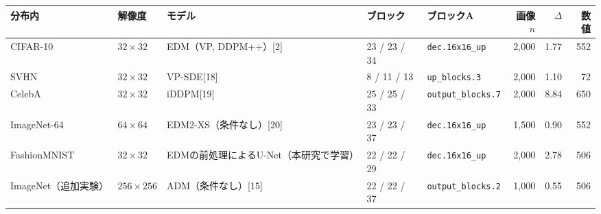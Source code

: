 \documentclass[border=3pt]{standalone}
\begin{document}
%
\begin{tabular}{lllllrrr}%
\toprule
分布内 & 解像度 & モデル & ブロック & ブロックA & 画像$n$ & $\Delta$ & 数値\\
\midrule
CIFAR-10 & $32{\times}32$ & EDM（VP, DDPM++）[2] & 23 / 23 / 34 & \texttt{dec.16x16\_up} & 2{,}000 & 1.77 & 552\\
SVHN & $32{\times}32$ & VP-SDE[18] & 8 / 11 / 13 & \texttt{up\_blocks.3} & 2{,}000 & 1.10 & 72\\
CelebA & $32{\times}32$ & iDDPM[19] & 25 / 25 / 33 & \texttt{output\_blocks.7} & 2{,}000 & 8.84 & 650\\
ImageNet-64 & $64{\times}64$ & EDM2-XS（条件なし）[20] & 23 / 23 / 37 & \texttt{dec.16x16\_up} & 1{,}500 & 0.90 & 552\\
FashionMNIST & $32{\times}32$ & EDMの前処理によるU-Net（本研究で学習） & 22 / 22 / 29 & \texttt{dec.16x16\_up} & 2{,}000 & 2.78 & 506\\
ImageNet（追加実験） & $256{\times}256$ & ADM（条件なし）[15] & 22 / 22 / 37 & \texttt{output\_blocks.2} & 1{,}000 & 0.55 & 506\\
\bottomrule
\end{tabular}%
\end{document}
